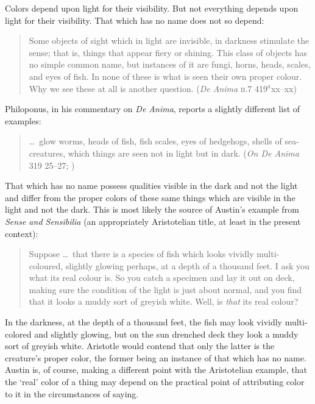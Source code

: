 Colors depend upon light for their visibility. But not everything depends upon light for their visibility. That which has no name does not so depend:
\begin{quote}
	Some objects of sight which in light are invisible, in darkness stimulate the sense; that is, things that appear fiery or shining. This class of objects has no simple common name, but instances of it are fungi, horns, heads, scales, and eyes of fish. In none of these is what is seen their own proper colour. Why we see these at all is another question. (\emph{De Anima} \textsc{ii}.7 419\( ^{a} \)xx--xx)
\end{quote}
Philoponus, in his commentary on \emph{De Anima}, reports a slightly different list of examples:
\begin{quote}
	\ldots\ glow worms, heads of fish, fish scales, eyes of hedgehogs, shells of sea-creatures, which things are seen not in light but in dark. (\emph{On \emph{De Anima}} 319 25--27; \citealt[3]{Charlton:2005fk})
\end{quote}
That which has no name possess qualities visible in the dark and not the light and differ from the proper colors of these same things which are visible in the light and not the dark. This is most likely the source of Austin's example from \emph{Sense and Sensibilia} (an appropriately Aristotelian title, at least in the present context):
\begin{quote}
	Suppose \ldots\ that there is a species of fish which looks vividly multi-coloured, slightly glowing perhaps, at a depth of a thousand feet. I ask you what its real colour is. So you catch a specimen and lay it out on deck, making sure the condition of the light is just about normal, and you find that it looks a muddy sort of greyish white. Well, is \emph{that} its real colour? \citep[lecture \textsc{vii}, 65--66]{Austin:1962lr}
\end{quote}
In the darkness, at the depth of a thousand feet, the fish may look vividly multi-colored and slightly glowing, but on the sun drenched deck they look a muddy sort of greyish white. Aristotle would contend that only the latter is the creature's proper color, the former being an instance of that which has no name. Austin is, of course, making a different point with the Aristotelian example, that the `real' color of a thing may depend on the practical point of attributing color to it in the circumstances of saying.

